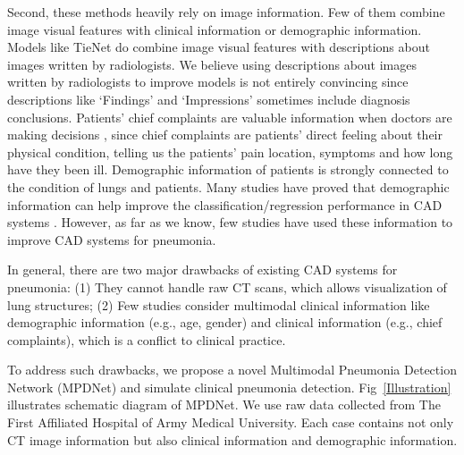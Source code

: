 \documentclass[journal]{IEEEtran}
\begin{document}
Second, these methods heavily rely on image information. Few of them combine image visual features with clinical information or demographic information. Models like TieNet do combine image visual features with descriptions about images written by radiologists. We believe using descriptions about images written by radiologists to improve models is not entirely convincing since descriptions like `Findings' and `Impressions' sometimes include diagnosis conclusions. Patients' chief complaints are valuable information when doctors are making decisions \cite{wu2018master}, since chief complaints are patients' direct feeling about their physical condition, telling us the patients' pain location, symptoms and how long have they been ill. 
Demographic information of patients is strongly connected to the condition of lungs and patients. Many studies have proved that demographic information can help improve the classification/regression performance in CAD systems \cite{frisoni2010clinical, coupe2012simultaneous, moradi2015machine, liu2018joint}. However, as far as we know, few studies have used these information to improve CAD systems for pneumonia. 

In general, there are two major drawbacks of existing CAD systems for pneumonia: (1) They cannot handle raw CT scans, which allows visualization of lung structures; (2) Few studies consider multimodal clinical information like demographic information (e.g., age, gender) and clinical information (e.g., chief complaints), which is a conflict to clinical practice.

To address such drawbacks, we propose a novel Multimodal Pneumonia Detection Network (MPDNet) and simulate clinical pneumonia detection. Fig~\ref{Illustration} illustrates schematic diagram of MPDNet. We use raw data collected from The First Affiliated Hospital of Army Medical University. Each case contains not only CT image information but also clinical information and demographic information.
 
\end{document}
